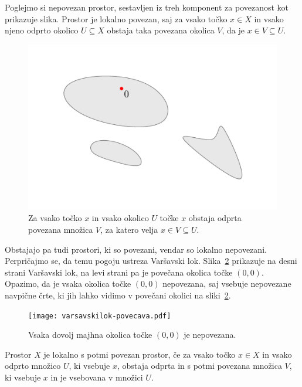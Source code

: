 \documentclass[../TG_magistrsko_delo_sections.tex]{subfiles}
\begin{document}
\begin{primer}
Poglejmo si nepovezan prostor, sestavljen iz treh komponent za povezanost kot prikazuje slika. Prostor je lokalno povezan, saj za vsako točko $x \in X$ in vsako njeno odprto okolico $U\subseteq X$ obstaja taka povezana okolica $V$, da je $x \in V \subseteq U$.
\begin{figure}[h]
  \centering
  \includegraphics{nepov-lokpov.pdf}
  \caption[Primer vektorske slike.]{Za vsako točko $x$ in vsako okolico $U$ točke $x$ obstaja odprta povezana množica $V$, za katero velja $x \in V \subseteq U$.}
  \label{fig:varsavski_lok}
\end{figure}
\end{primer}

Obstajajo pa tudi prostori, ki so povezani, vendar so lokalno nepovezani. Perpričajmo se, da temu pogoju ustreza Varšavski lok. Slika~\ref{fig:vl-lok-nepovezan} prikazuje na desni strani Varšavski lok, na levi strani pa je povečana okolica točke $(0, 0)$. Opazimo, da je vsaka okolica točke $(0, 0)$ nepovezana, saj vsebuje nepovezane navpične črte, ki jih lahko vidimo v povečani okolici na sliki~\ref{fig:vl-lok-nepovezan}.

\begin{figure}[h]
  \centering
  \texttt{[image: varsavskilok-povecava.pdf]}
  \caption[Primer vektorske slike.]{Vsaka dovolj majhna okolica točke $(0, 0)$ je nepovezana.}
  \label{fig:vl-lok-nepovezan}
\end{figure}

\begin{definicija}
Prostor $X$ je lokalno s potmi povezan prostor, če za vsako točko $ x\in X$ in vsako odprto množico $U$, ki vsebuje $x$, obstaja odprta in s potmi povezana množica $V$, ki vsebuje $x$ in je vsebovana v množici $U$.
\end{definicija}
\end{document}
